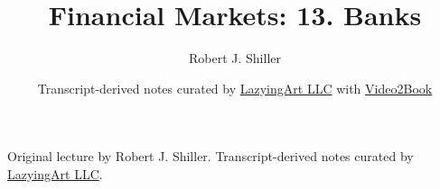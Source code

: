 \documentclass[11pt,oneside]{book}
\begin{document}
\frontmatter
\title{Financial Markets: 13. Banks}
\author{Robert J. Shiller}
\date{Transcript-derived notes curated by \href{https://lazying.art}{LazyingArt LLC} with \href{https://github.com/lachlanchen/Video2Book}{Video2Book}}
\maketitle
\begin{center}
\small Original lecture by Robert J. Shiller. Transcript-derived notes curated by \href{https://lazying.art}{LazyingArt LLC}.
\end{center}
\clearpage
\mainmatter

\end{document}
